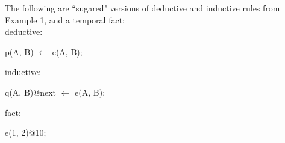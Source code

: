 
\begin{example}
The following are ``sugared" versions of deductive and inductive rules from Example 1, and a temporal fact:
\\
deductive:
\begin{Dedalus}
p(A, B) \(\leftarrow\) e(A, B);
\end{Dedalus}
inductive:
\begin{Dedalus}
q(A, B)@next \(\leftarrow\) e(A, B);
\end{Dedalus}
fact:
\begin{Dedalus}
e(1, 2)@10;
\end{Dedalus}

\end{example}


% 
% 





%
%


